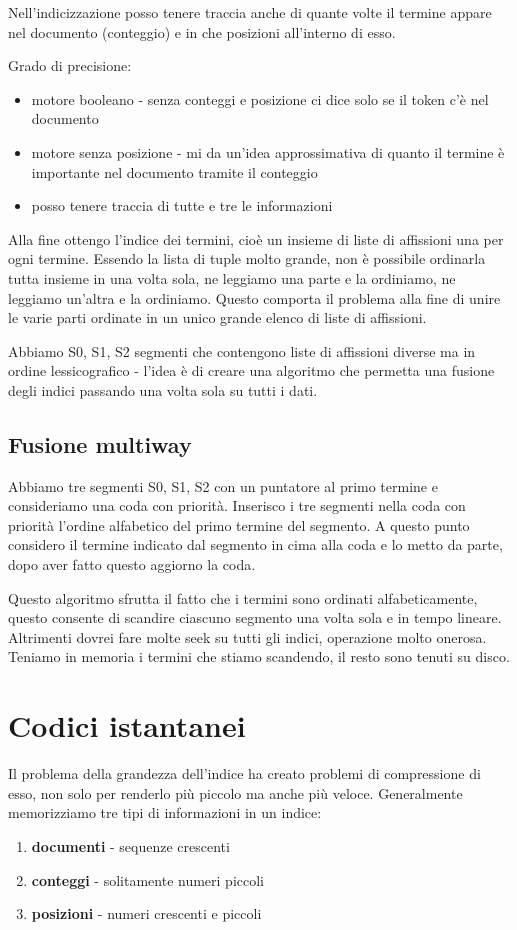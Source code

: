 \documentclass[12pt,italian]{report}
\begin{document}
Nell'indicizzazione posso tenere traccia anche di quante volte il termine appare nel documento (conteggio) e in che posizioni all'interno di esso.\medskip

Grado di precisione:
\begin{itemize}
    \item motore booleano - senza conteggi e posizione ci dice solo se il token c'è nel documento
    \item motore senza posizione - mi da un'idea approssimativa di quanto il termine è importante nel documento tramite il conteggio
    \item posso tenere traccia di tutte e tre le informazioni
\end{itemize}

Alla fine ottengo l'indice dei termini, cioè un insieme di liste di affissioni una per ogni termine.
Essendo la lista di tuple molto grande, non è possibile ordinarla tutta insieme in una volta sola, ne leggiamo una parte e la ordiniamo, ne leggiamo un'altra e la ordiniamo. 
Questo comporta il problema alla fine di unire le varie parti ordinate in un unico grande elenco di liste di affissioni. 

Abbiamo S0, S1, S2 segmenti che contengono liste di affissioni diverse ma in ordine lessicografico - l'idea è di creare una algoritmo che permetta una fusione degli indici passando una volta sola su tutti i dati.

\section{Fusione multiway}
\label{fusionemultiway}
Abbiamo tre segmenti S0, S1, S2 con un puntatore al primo termine e consideriamo una coda con priorità. Inserisco i tre segmenti nella coda con priorità l'ordine alfabetico del primo termine del segmento.
A questo punto considero il termine indicato dal segmento in cima alla coda e lo metto da parte, dopo aver fatto questo aggiorno la coda.

Questo algoritmo sfrutta il fatto che i termini sono ordinati alfabeticamente, questo consente di scandire ciascuno segmento una volta sola e in tempo lineare. Altrimenti dovrei fare molte seek su tutti gli indici, operazione molto onerosa.
Teniamo in memoria i termini che stiamo scandendo, il resto sono tenuti su disco.
\clearpage

\chapter{Codici istantanei}
\label{cap:codiciistantanei}
Il problema della grandezza dell'indice ha creato problemi di compressione di esso, non solo per renderlo più piccolo ma anche più veloce.
Generalmente memorizziamo tre tipi di informazioni in un indice:
\begin{enumerate}
    \item \textbf{documenti} - sequenze crescenti 
    \item \textbf{conteggi} - solitamente numeri piccoli
    \item \textbf{posizioni} - numeri crescenti e piccoli 
\end{enumerate}
\end{document}
